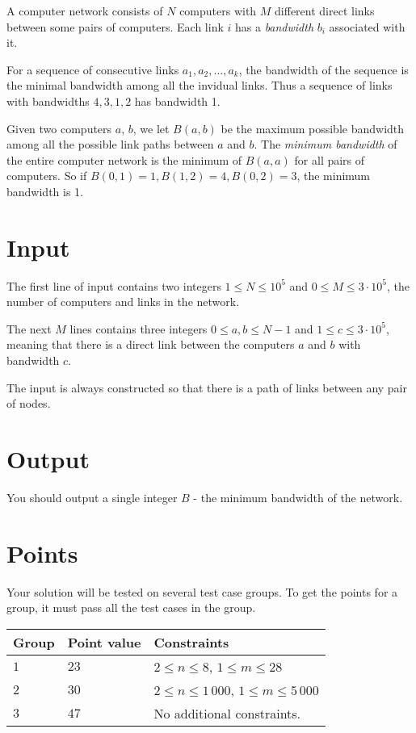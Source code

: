 A computer network consists of $N$ computers with $M$ different direct links between some pairs of computers. Each link $i$ has a \emph{bandwidth} $b_i$ associated with it.

For a sequence of consecutive links $a_1, a_2, ..., a_k$, the bandwidth of the sequence is the minimal bandwidth among all the invidual links. Thus a sequence of links with bandwidths $4, 3, 1, 2$ has bandwidth 1.

Given two computers $a$, $b$, we let $B(a, b)$ be the maximum possible bandwidth among all the possible link paths between $a$ and $b$. The \emph{minimum bandwidth} of the entire computer network is the minimum of $B(a, a)$ for all pairs of computers. So if $B(0, 1) = 1, B(1, 2) = 4, B(0, 2) = 3$, the minimum bandwidth is 1.


\section*{Input}
The first line of input contains two integers $1 \le N \le 10^5$ and $0 \le M \le 3 \cdot 10 ^5$, the number of computers and links in the network.

The next $M$ lines contains three integers $0 \le a, b \le N - 1$ and $1 \le c \le 3 \cdot 10^5$, meaning that there is a direct link between the computers $a$ and $b$ with bandwidth $c$.

The input is always constructed so that there is a path of links between any pair of nodes.


\section*{Output}
You should output a single integer $B$ - the minimum bandwidth of the network.

\section*{Points}
Your solution will be tested on several test case groups.
To get the points for a group, it must pass all the test cases in the group.

\noindent
\begin{tabular}{| l | l | p{12cm} |}
  \hline
  \textbf{Group} & \textbf{Point value} & \textbf{Constraints} \\ \hline
  $1$    & $23$      & $2 \le n \le 8$, $1 \le m \le 28$ \\ \hline
  $2$    & $30$      & $2 \le n \le 1\,000$, $1 \le m \le 5\,000$ \\ \hline
  $3$    & $47$      & No additional constraints. \\ \hline
\end{tabular}
